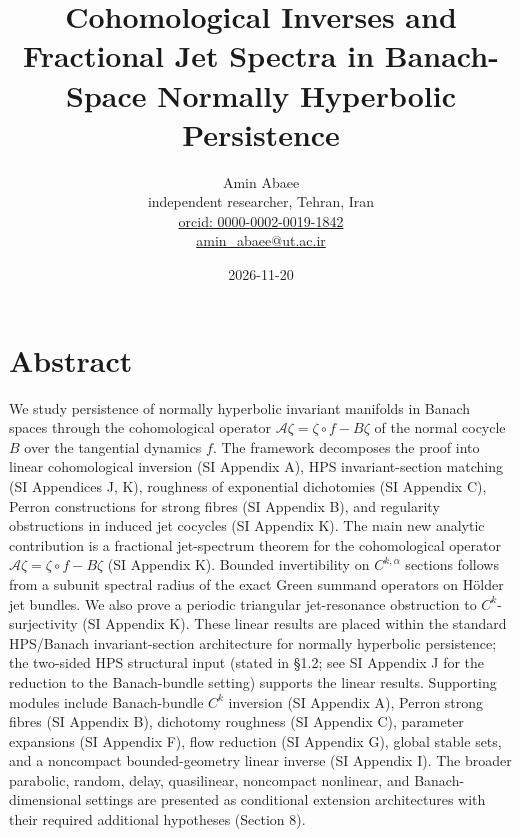 \documentclass[11pt,a4paper]{article}
\title{Cohomological Inverses and Fractional Jet Spectra in Banach-Space Normally Hyperbolic Persistence}
\author{Amin Abaee \\ independent researcher, Tehran, Iran \\ \href{https://orcid.org/0000-0002-0019-1842}{orcid: 0000-0002-0019-1842} \\ \href{mailto:amin_abaee@ut.ac.ir}{amin\_abaee@ut.ac.ir}}
\date{2026-11-20}
\theoremstyle{plain}
\theoremstyle{definition}
\theoremstyle{remark}
\numberwithin{equation}{section}
\numberwithin{figure}{section}
\begin{document}
\maketitle

\section*{Abstract}

We study persistence of normally hyperbolic invariant manifolds in Banach spaces through the cohomological operator $\mathcal A\zeta=\zeta\circ f-B\zeta$ of the normal cocycle $B$ over the tangential dynamics $f$. The framework decomposes the proof into linear cohomological inversion (SI Appendix A), HPS invariant-section matching (SI Appendices J, K), roughness of exponential dichotomies (SI Appendix C), Perron constructions for strong fibres (SI Appendix B), and regularity obstructions in induced jet cocycles (SI Appendix K). The main new analytic contribution is a fractional jet-spectrum theorem for the cohomological operator $\mathcal A\zeta=\zeta\circ f-B\zeta$ (SI Appendix K). Bounded invertibility on $C^{k,\alpha}$ sections follows from a subunit spectral radius of the exact Green summand operators on Hölder jet bundles. We also prove a periodic triangular jet-resonance obstruction to $C^k$-surjectivity (SI Appendix K). These linear results are placed within the standard HPS/Banach invariant-section architecture for normally hyperbolic persistence; the two-sided HPS structural input (stated in §1.2; see SI Appendix J for the reduction to the Banach-bundle setting) supports the linear results. Supporting modules include Banach-bundle $C^k$ inversion (SI Appendix A), Perron strong fibres (SI Appendix B), dichotomy roughness (SI Appendix C), parameter expansions (SI Appendix F), flow reduction (SI Appendix G), global stable sets, and a noncompact bounded-geometry linear inverse (SI Appendix I). The broader parabolic, random, delay, quasilinear, noncompact nonlinear, and Banach-dimensional settings are presented as conditional extension architectures with their required additional hypotheses (Section 8).

\begin{center}
\end{center}
\end{document}
